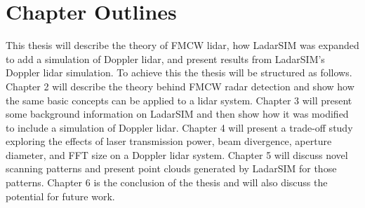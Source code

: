 \section{Chapter Outlines}
This thesis will describe the theory of FMCW lidar, how LadarSIM was expanded to add a simulation of Doppler lidar, 
and present results from LadarSIM's Doppler lidar simulation. To achieve this the thesis will be structured as 
follows. Chapter 2 will describe the theory behind FMCW radar detection and show how the same basic concepts can be 
applied to a lidar system. Chapter 3 will present some background information on LadarSIM and then show how it was 
modified to include a simulation of Doppler lidar. Chapter 4 will present a trade-off study exploring the effects 
of laser transmission power, beam divergence, aperture diameter, and FFT size on a Doppler lidar system. Chapter 5
will discuss novel scanning patterns and present point clouds generated by LadarSIM for those patterns. Chapter 6 
is the conclusion of the thesis and will also discuss the potential for future work. 




